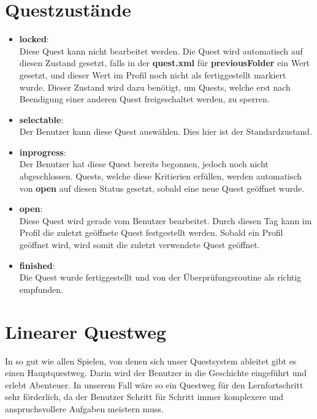 


\section{Questzustände}
\label{sec:Queststate}
\begin{itemize}
\item \textbf{locked}:\\ Diese Quest kann nicht bearbeitet werden. Die Quest wird automatisch auf diesen Zustand gesetzt, falls in der \textbf{quest.xml} für \textbf{previousFolder} ein Wert gesetzt, und dieser Wert im Profil noch nicht als fertiggestellt markiert wurde. Dieser Zustand wird dazu benötigt, um Quests, welche erst nach Beendigung einer anderen Quest freigeschaltet werden, zu sperren.
\item \textbf{selectable}:\\ Der Benutzer kann diese Quest auswählen. Dies hier ist der Standardzustand.
\item \textbf{inprogress}:\\ Der Benutzer hat diese Quest bereits begonnen, jedoch noch nicht abgeschlossen. Quests, welche diese Kritierien erfüllen, werden automatisch von \textbf{open} auf diesen Status gesetzt, sobald eine neue Quest geöffnet wurde.
\item \textbf{open}:\\ Diese Quest wird gerade vom Benutzer bearbeitet. Durch diesen Tag kann im Profil die zuletzt geöffnete Quest festgestellt werden. Sobald ein Profil geöffnet wird, wird somit die zuletzt verwendete Quest geöffnet.
\item \textbf{finished}:\\ Die Quest wurde fertiggestellt und von der Überprüfungsroutine als richtig empfunden.
\end{itemize}

\section{Linearer Questweg}
In so gut wie allen Spielen, von denen sich unser Questsystem ableitet gibt es einen Hauptquestweg. Darin wird der Benutzer in die Geschichte eingeführt und erlebt Abenteuer. In unserem Fall wäre so ein Questweg für den Lernfortschritt sehr förderlich, da der Benutzer Schritt für Schritt immer komplexere und anspruchsvollere Aufgaben meistern muss.


